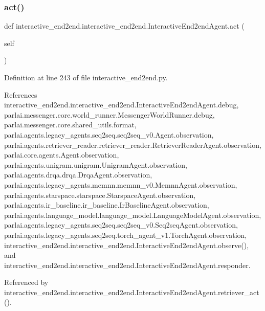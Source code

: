 \subsubsection{\texorpdfstring{act()}{act()}}
{\footnotesize\ttfamily def interactive\+\_\+end2end.\+interactive\+\_\+end2end.\+Interactive\+End2end\+Agent.\+act (\begin{DoxyParamCaption}\item[{}]{self }\end{DoxyParamCaption})}



Definition at line 243 of file interactive\+\_\+end2end.\+py.



References interactive\+\_\+end2end.\+interactive\+\_\+end2end.\+Interactive\+End2end\+Agent.\+debug, parlai.\+messenger.\+core.\+world\+\_\+runner.\+Messenger\+World\+Runner.\+debug, parlai.\+messenger.\+core.\+shared\+\_\+utils.\+format, parlai.\+agents.\+legacy\+\_\+agents.\+seq2seq.\+seq2seq\+\_\+v0.\+Agent.\+observation, parlai.\+agents.\+retriever\+\_\+reader.\+retriever\+\_\+reader.\+Retriever\+Reader\+Agent.\+observation, parlai.\+core.\+agents.\+Agent.\+observation, parlai.\+agents.\+unigram.\+unigram.\+Unigram\+Agent.\+observation, parlai.\+agents.\+drqa.\+drqa.\+Drqa\+Agent.\+observation, parlai.\+agents.\+legacy\+\_\+agents.\+memnn.\+memnn\+\_\+v0.\+Memnn\+Agent.\+observation, parlai.\+agents.\+starspace.\+starspace.\+Starspace\+Agent.\+observation, parlai.\+agents.\+ir\+\_\+baseline.\+ir\+\_\+baseline.\+Ir\+Baseline\+Agent.\+observation, parlai.\+agents.\+language\+\_\+model.\+language\+\_\+model.\+Language\+Model\+Agent.\+observation, parlai.\+agents.\+legacy\+\_\+agents.\+seq2seq.\+seq2seq\+\_\+v0.\+Seq2seq\+Agent.\+observation, parlai.\+agents.\+legacy\+\_\+agents.\+seq2seq.\+torch\+\_\+agent\+\_\+v1.\+Torch\+Agent.\+observation, interactive\+\_\+end2end.\+interactive\+\_\+end2end.\+Interactive\+End2end\+Agent.\+observe(), and interactive\+\_\+end2end.\+interactive\+\_\+end2end.\+Interactive\+End2end\+Agent.\+responder.



Referenced by interactive\+\_\+end2end.\+interactive\+\_\+end2end.\+Interactive\+End2end\+Agent.\+retriever\+\_\+act().

